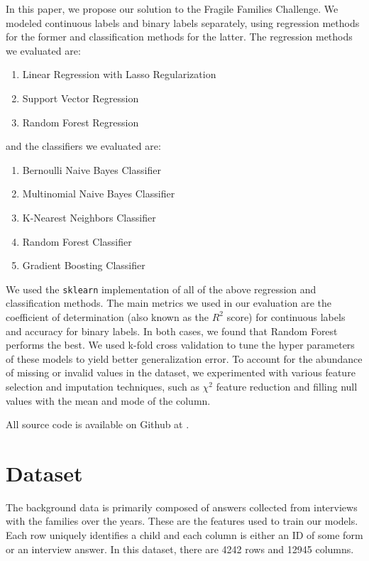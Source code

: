 \documentclass{article} %
\begin{document}
In this paper, we propose our solution to the Fragile Families Challenge. We modeled continuous labels and binary labels separately, using regression methods for the former and classification methods for the latter. The regression methods we evaluated are:

\begin{enumerate}
\item Linear Regression with Lasso Regularization
\item Support Vector Regression
\item Random Forest Regression
\end{enumerate}
and the classifiers we evaluated are:
\begin{enumerate}
\item Bernoulli Naive Bayes Classifier
\item Multinomial Naive Bayes Classifier
\item K-Nearest Neighbors Classifier
\item Random Forest Classifier
\item Gradient Boosting Classifier
\end{enumerate}

We used the \texttt{sklearn} implementation of all of the above regression and classification methods. The main metrics we used in our evaluation are the coefficient of determination (also known as the $R^2$ score) for continuous labels and accuracy for binary labels. In both cases, we found that Random Forest performs the best. We used k-fold cross validation to tune the hyper parameters of these models to yield better generalization error. To account for the abundance of missing or invalid values in the dataset, we experimented with various feature selection and imputation techniques, such as $\chi^2$ feature reduction and filling null values with the mean and mode of the column.

All source code is available on Github at \cite{myrepo}.

\section{Dataset}
\label{sec:dataset}

The background data is primarily composed of answers collected from interviews with the families over the years. These are the features used to train our models. Each row uniquely identifies a child and each column is either an ID of some form or an interview answer. In this dataset, there are 4242 rows and 12945 columns.
\end{document}

